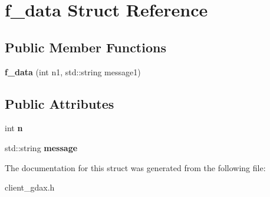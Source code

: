 \hypertarget{structf__data}{}\section{f\+\_\+data Struct Reference}
\label{structf__data}
\subsection*{Public Member Functions}
\begin{DoxyCompactItemize}
\item 
\mbox{\label{structf__data_a1d9dd171db66371468e372138cf72c69}} 
{\bfseries f\+\_\+data} (int n1, std\+::string message1)
\end{DoxyCompactItemize}
\subsection*{Public Attributes}
\begin{DoxyCompactItemize}
\item 
\mbox{\label{structf__data_afdbfdcb60a1554ad6eec9053f575c603}} 
int {\bfseries n}
\item 
\mbox{\label{structf__data_a6783111765c49ed9282dfcb1ce45abd0}} 
std\+::string {\bfseries message}
\end{DoxyCompactItemize}


The documentation for this struct was generated from the following file\+:\begin{DoxyCompactItemize}
\item 
client\+\_\+gdax.\+h\end{DoxyCompactItemize}
